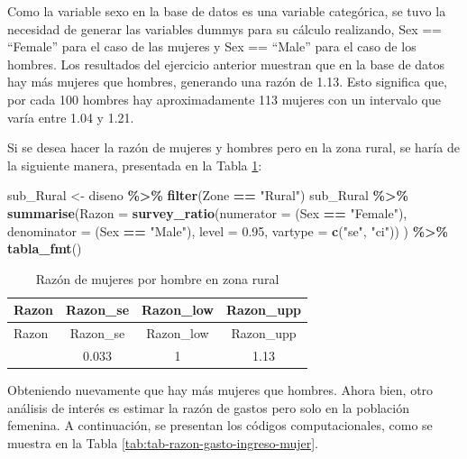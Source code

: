 \documentclass[
  spanish,
  12pt,
]{book}
\newenvironment{Shaded}{\begin{snugshade}}{\end{snugshade}}
\newcommand{\AttributeTok}[1]{\textcolor[rgb]{0.13,0.29,0.53}{#1}}
\newcommand{\FloatTok}[1]{\textcolor[rgb]{0.00,0.00,0.81}{#1}}
\newcommand{\FunctionTok}[1]{\textcolor[rgb]{0.13,0.29,0.53}{\textbf{#1}}}
\newcommand{\NormalTok}[1]{#1}
\newcommand{\OtherTok}[1]{\textcolor[rgb]{0.56,0.35,0.01}{#1}}
\newcommand{\SpecialCharTok}[1]{\textcolor[rgb]{0.81,0.36,0.00}{\textbf{#1}}}
\newcommand{\StringTok}[1]{\textcolor[rgb]{0.31,0.60,0.02}{#1}}
\begin{document}
Como la variable sexo en la base de datos es una variable categórica, se tuvo la necesidad de generar las variables dummys para su cálculo realizando, Sex == ``Female'' para el caso de las mujeres y Sex == ``Male'' para el caso de los hombres. Los resultados del ejercicio anterior muestran que en la base de datos hay más mujeres que hombres, generando una razón de 1.13. Esto significa que, por cada 100 hombres hay aproximadamente 113 mujeres con un intervalo que varía entre 1.04 y 1.21.

Si se desea hacer la razón de mujeres y hombres pero en la zona rural, se haría de la siguiente manera, presentada en la Tabla \ref{tab:tab-razon-sexo-rural}:

\begin{Shaded}
\begin{Highlighting}[]
\NormalTok{sub\_Rural  }\OtherTok{\textless{}{-}}\NormalTok{ diseno }\SpecialCharTok{\%\textgreater{}\%}  \FunctionTok{filter}\NormalTok{(Zone }\SpecialCharTok{==} \StringTok{"Rural"}\NormalTok{)}
\NormalTok{sub\_Rural }\SpecialCharTok{\%\textgreater{}\%} 
  \FunctionTok{summarise}\NormalTok{(}\AttributeTok{Razon =}  \FunctionTok{survey\_ratio}\NormalTok{(}\AttributeTok{numerator =}\NormalTok{ (Sex }\SpecialCharTok{==} \StringTok{"Female"}\NormalTok{),}
                                  \AttributeTok{denominator =}\NormalTok{ (Sex }\SpecialCharTok{==} \StringTok{"Male"}\NormalTok{),}
                                  \AttributeTok{level =} \FloatTok{0.95}\NormalTok{,}
                                  \AttributeTok{vartype =}  \FunctionTok{c}\NormalTok{(}\StringTok{"se"}\NormalTok{, }\StringTok{"ci"}\NormalTok{))}
\NormalTok{            ) }\SpecialCharTok{\%\textgreater{}\%}
  \FunctionTok{tabla\_fmt}\NormalTok{()}
\end{Highlighting}
\end{Shaded}

\begin{longtable}[]{@{}lccc@{}}
\caption{\label{tab:tab-razon-sexo-rural}Razón de mujeres por hombre en zona rural}\tabularnewline
\toprule\noalign{}
Razon & Razon\_se & Razon\_low & Razon\_upp \\
\midrule\noalign{}
\endfirsthead
\toprule\noalign{}
Razon & Razon\_se & Razon\_low & Razon\_upp \\
\midrule\noalign{}
\endhead
\bottomrule\noalign{}
\endlastfoot
1.07 & 0.033 & 1 & 1.13 \\
\end{longtable}

Obteniendo nuevamente que hay más mujeres que hombres. Ahora bien, otro análisis de interés es estimar la razón de gastos pero solo en la población femenina. A continuación, se presentan los códigos computacionales, como se muestra en la Tabla \ref{tab:tab-razon-gasto-ingreso-mujer}.
\end{document}

